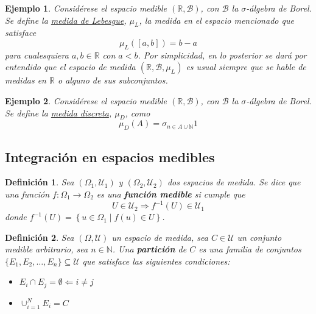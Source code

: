 \documentclass[12pt,letterpaper]{book}
\newtheorem{definicion}{Definición}[chapter]
\newtheorem{ejemplo}{Ejemplo}[chapter]
\newcommand{\R}{\mathbb{R}}
\newcommand{\N}{\mathbb{N}}
\newcommand{\talque}{\mathrel{}\middle|\mathrel{}}
\begin{document}
\begin{ejemplo}
Considérese el espacio medible $(\R, \mathcal{B})$, con $\mathcal{B}$ la $\sigma$-álgebra de Borel. Se define la \ul{medida de Lebesgue}, $\mu_L$, la medida en el espacio mencionado que satisface 
\begin{equation}
\mu_L([a,b]) = b-a
\end{equation}
para cualesquiera $a,b \in \R$ con $a<b$. Por simplicidad, en lo posterior se dará por entendido que el espacio de medida $(\R, \mathcal{B},\mu_L)$ es \textit{usual} siempre que se hable de medidas en $\R$ o alguno de sus subconjuntos.
\end{ejemplo}

\begin{ejemplo}
Considérese el espacio medible $(\R, \mathcal{B})$, con $\mathcal{B}$ la $\sigma$-álgebra de Borel. Se define la \ul{medida discreta}, $\mu_D$, como
\begin{equation}
\mu_D(A) = \sigma_{n \in A \cup \N} 1
\end{equation}
\end{ejemplo}


\subsection{Integración en espacios medibles}

\begin{definicion}
Sea $(\Omega_1, \mathcal{U}_1)$ y $(\Omega_2, \mathcal{U}_2)$ dos espacios de medida. Se dice que una función $f:\Omega_1\rightarrow\Omega_2$ es una \textbf{función medible} si cumple que
\begin{equation}
U \in \mathcal{U}_2 \Rightarrow f^{-1}(U) \in \mathcal{U}_1 
\end{equation}
donde $f^{-1}(U) = \left\{ u\in \Omega_1 \talque f(u) \in U \right\}$.
\end{definicion}

\begin{definicion}
Sea $(\Omega, \mathcal{U})$ un espacio de medida, sea $C \in \mathcal{U}$ un conjunto medible arbitrario, sea $n\in \N$. Una \textbf{partición} de $C$ es una familia de conjuntos $\{E_1, E_2, \dots, E_n\} \subseteq\mathcal{U}$ que satisface las siguientes condiciones:
\begin{itemize}
\item $E_i \cap E_j = \emptyset \Leftarrow i\neq j $
\item $\cup_{i=1}^{N}  E_i = C $
\end{itemize}
\end{definicion}
\end{document}
